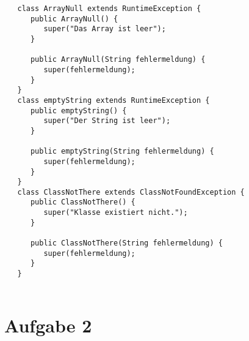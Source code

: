\documentclass[12pt,a4paper,oneside,ngerman]{article}
\begin{document}
\begin{lstlisting}
   class ArrayNull extends RuntimeException {
      public ArrayNull() {
         super("Das Array ist leer");
      }
   
      public ArrayNull(String fehlermeldung) {
         super(fehlermeldung);
      }
   }
   class emptyString extends RuntimeException {
      public emptyString() {
         super("Der String ist leer");
      }
   
      public emptyString(String fehlermeldung) {
         super(fehlermeldung);
      }
   }
   class ClassNotThere extends ClassNotFoundException {
      public ClassNotThere() {
         super("Klasse existiert nicht.");
      }
   
      public ClassNotThere(String fehlermeldung) {
         super(fehlermeldung);
      }
   }
   
\end{lstlisting}

\section*{Aufgabe 2}
\end{document}
